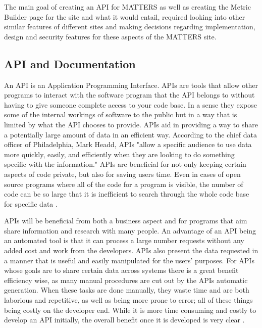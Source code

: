 		The main goal of creating an API for MATTERS as well as creating the Metric 
		Builder page for the site and what it would entail, required looking into other 
		similar features of different sites and making decisions regarding implementation,
		design and security features for these aspects of the MATTERS site.

	\subsection{API and Documentation}

		An API is an Application Programming Interface. APIs are tools that allow other 
		programs to interact with the software program that the API belongs to without 
		having to give someone complete access to your code base. In a sense they expose 
		some of the internal workings of software to the public but in a way that is 
		limited by what the API chooses to provide. APIs aid in providing a way to share 
		a potentially large amount of data in an efficient way. According to the chief 
		data officer of Philadelphia, Mark Headd, APIs "allow a specific audience to use 
		data more quickly, easily, and efficiently when they are looking to do something 
		specific with the information." APIs are beneficial for not only keeping certain 
		aspects of code private, but also for saving users time. Even in cases of open 
		source programs where all of the code for a program is visible, the number of 
		code can be so large that it is inefficient to search through the whole code base 
		for specific data \cite{govapi}. 

		APIs will be beneficial from both a business aspect and for programs that aim share 
		information and research with many people. An advantage of an API being an automated 
		tool is that it can process a large number requests without any added cost and work 
		from the developers. APIs also present the data requested in a manner that is useful 
		and easily manipulated for the users' purposes. For APIs whose goals are to share 
		certain data across systems there is a great benefit efficiency wise, as many manual 
		procedures are cut out by the APIs automatic generation. When these tasks are done 
		manually, they waste time and are both laborious and repetitive, as well as being more 
		prone to error; all of these things being costly on the developer end. While it is more 
		time consuming and costly to develop an API initially, the overall benefit once it is 
		developed is very clear \cite{govapi}.

